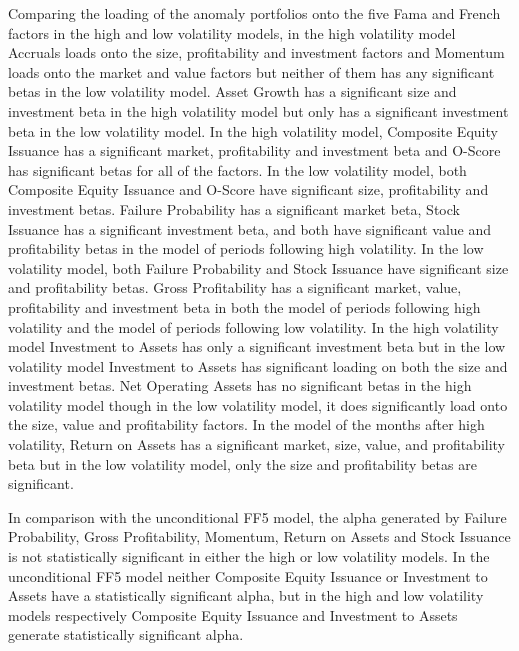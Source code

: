 \documentclass[12pt, a4paper, oneside]{article}
\begin{document}
Comparing the loading of the anomaly portfolios onto the five Fama and French factors in the high and low volatility models, in the high volatility model Accruals loads onto the size, profitability and investment factors and Momentum loads onto the market and value factors but neither of them has any significant betas in the low volatility model. Asset Growth has a significant size and investment beta in the high volatility model but only has a significant investment beta in the low volatility model. In the high volatility model, Composite Equity Issuance has a significant market, profitability and investment beta and O-Score has significant betas for all of the factors. In the low volatility model, both Composite Equity Issuance and O-Score have significant size, profitability and investment betas. Failure Probability has a significant market beta, Stock Issuance has a significant investment beta, and both have significant value and profitability betas in the model of periods following high volatility. In the low volatility model, both Failure Probability and Stock Issuance have significant size and profitability betas. Gross Profitability has a significant market, value, profitability and investment beta in both the model of periods following high volatility and the model of periods following low volatility. In the high volatility model Investment to Assets has only a significant investment beta but in the low volatility model Investment to Assets has significant loading on both the size and investment betas. Net Operating Assets has no significant betas in the high volatility model though in the low volatility model, it does significantly load onto the size, value and profitability factors. In the model of the months after high volatility, Return on Assets has a significant market, size, value, and profitability beta but in the low volatility model, only the size and profitability betas are significant. 

In comparison with the unconditional FF5 model, the alpha generated by Failure Probability, Gross Profitability, Momentum, Return on Assets and Stock Issuance is not statistically significant in either the high or low volatility models. In the unconditional FF5 model neither Composite Equity Issuance or Investment to Assets have a statistically significant alpha, but in the high and low volatility models respectively Composite Equity Issuance and Investment to Assets generate statistically significant alpha. 
\end{document}
